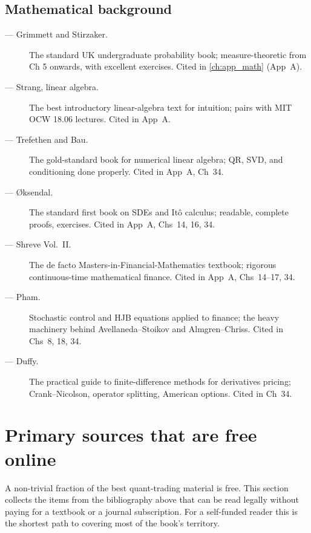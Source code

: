 \subsection{Mathematical background}

\begin{description}
  \item[\citet{grimmett2001probability} --- Grimmett and Stirzaker.]
    The standard UK undergraduate probability book; measure-theoretic
    from Ch 5 onwards, with excellent exercises. Cited in
    \cref{ch:app_math} (App~A).
  \item[\citet{strang2016linalg} --- Strang, linear algebra.]
    The best introductory linear-algebra text for intuition; pairs
    with MIT OCW 18.06 lectures. Cited in App~A.
  \item[\citet{trefethen1997numerical} --- Trefethen and Bau.] The
    gold-standard book for numerical linear algebra; QR, SVD, and
    conditioning done properly. Cited in App~A, Ch~34.
  \item[\citet{oksendal2003stochastic} --- {\O}ksendal.] The
    standard first book on SDEs and It\^o calculus; readable,
    complete proofs, exercises. Cited in App~A, Chs~14, 16, 34.
  \item[\citet{shreve2004stochastic} --- Shreve Vol.~II.] The
    de facto Masters-in-Financial-Mathematics textbook; rigorous
    continuous-time mathematical finance. Cited in App~A, Chs~14--17,
    34.
  \item[\citet{pham2009continuous} --- Pham.] Stochastic control
    and HJB equations applied to finance; the heavy machinery behind
    Avellaneda--Stoikov and Almgren--Chriss. Cited in Chs~8, 18, 34.
  \item[\citet{duffy2006finite} --- Duffy.] The practical guide to
    finite-difference methods for derivatives pricing; Crank--Nicolson,
    operator splitting, American options. Cited in Ch~34.
\end{description}

\section{Primary sources that are free online}
\label{sec:app_biblio_free}

A non-trivial fraction of the best quant-trading material is free.
This section collects the items from the bibliography above that can
be read legally without paying for a textbook or a journal
subscription. For a self-funded reader this is the shortest path to
covering most of the book's territory.

